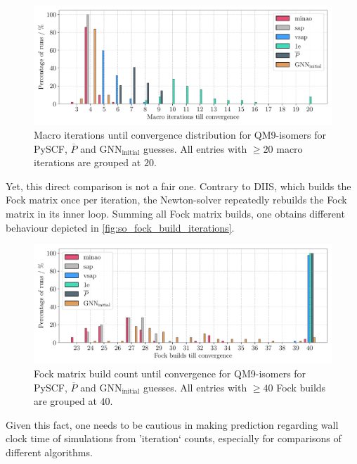 \begin{figure}[H]
    \centering
    \includegraphics[width=\textwidth]{../fig/gnn/SO_0D_GNN_model_iteration_count_bar.pdf}
    \caption[Macro iterations until convergence distribution for QM9-isomers]{Macro iterations until convergence distribution for QM9-isomers for PySCF, $\overline{P}$ and GNN$_\text{initial}$ guesses. All entries with $\geq 20$ macro iterations are grouped at $20$.}
    \label{fig:so_macro_iterations}
\end{figure}
Yet, this direct comparison is not a fair one. Contrary to DIIS, which builds the Fock matrix once per iteration, the Newton-solver repeatedly rebuilds the Fock matrix in its inner loop. Summing all Fock matrix builds, one obtains different behaviour depicted in \autoref{fig:so_fock_build_iterations}.  
\begin{figure}[H]
    \centering
    \includegraphics[width=\textwidth]{../fig/gnn/SO_0D_GNN_model_fock_build_count_bar.pdf}
    \caption[Fock matrix build count until convergence QM9-isomers]{Fock matrix build count until convergence for QM9-isomers for PySCF, $\overline{P}$ and GNN$_\text{initial}$ guesses. All entries with $\geq 40$ Fock builds are grouped at $40$.}
    \label{fig:so_fock_build_iterations}
\end{figure}
Given this fact, one needs to be cautious in making prediction regarding wall clock time of simulations from 'iteration` counts, especially for comparisons of different algorithms.

